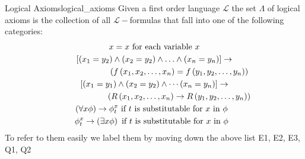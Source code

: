 \begin{definition}{Logical Axioms}{logical_axioms}
 Given a first order language $ \mathcal{ L }   $ the set $\Lambda$ of logical
 axioms is the collection of all $ \mathcal{ L }-$formulas that fall into one of
 the following categories:
\begin{gather*}
    x=x  ~\text{for each variable}~ x \\
    \left[ \left( x _{ 1 } = y _{ 2 }  \right) \land \left( x _{ 2 } = y _{
    2}\right) \land \ldots \land \left( x _{ n } =  y _{ n }    \right)
    \right] \rightarrow \\
    \qquad \qquad \qquad \left( f\left( x_{1} , x_{2} , \dotsc , x_{n} \right) = f\left( y_{1} ,
    y_{2} , \dotsc , y_{n} \right)  \right) \\
    \left[\left(x_{1}=y_{1}\right) \wedge\left(x_{2}=y_{2}\right) \wedge \cdots
    \left(x_{n}=y_{n}\right)\right] \rightarrow \\
    \qquad \qquad \qquad \left(R\left(x_{1}, x_{2}, \ldots, x_{n}\right) \rightarrow
    R\left(y_{1}, y_{2}, \ldots, y_{n}\right)\right)\\
    \left( \forall x \phi  \right) \rightarrow \phi _{ t }^{ x } ~\text{if $ t $
    is substitutable for $ x $ in $ \phi  $ }~  \\
    \phi _{ t }^{ x } \to \left( \exists x \phi \right) ~\text{if $ t $ is
    substitutable for $ x $ in $ \phi  $ }~  
\end{gather*}
To refer to them easily we label them by  moving down the above list E1, E2, E3,
Q1, Q2 
\end{definition}
